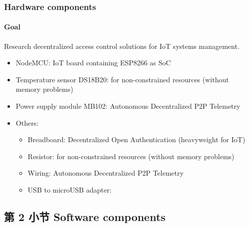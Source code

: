 \documentclass[
    aspectratio=169,                   %
]{beamer}
\begin{document}
    \begin{frame}
        \frametitle{Hardware components}

        \paragraph{Goal} Research decentralized access control solutions for IoT systems management.\cite{ouaddah}

        \begin{itemize}
            \item \alert{NodeMCU}: IoT board containing ESP8266 as SoC
            \item \alert{Temperature sensor DS18B20}: for non-constrained resources (without memory problems)\cite{ouaddah}
            \item \alert{Power supply module MB102}: Autonomous Decentralized P2P Telemetry
            \item \alert{Others:}
            \begin{itemize}
                \item \alert{Breadboard}: Decentralized Open Authentication (heavyweight for IoT)
                \item \alert{Resistor}: for non-constrained resources (without memory problems)
                \item \alert{Wiring}: Autonomous Decentralized P2P Telemetry   
                \item \alert{USB to microUSB adapter}:      
            \end{itemize}
        \end{itemize}

    \end{frame}

\subsection{第 2 小节 Software components}
\end{document}
